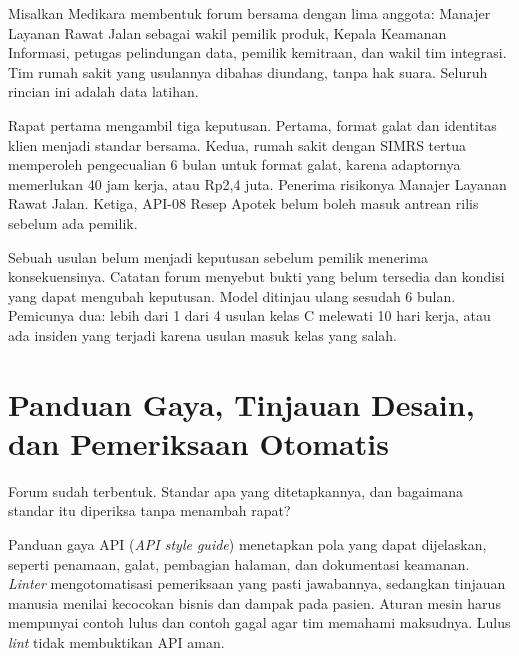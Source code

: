 \begin{kasus}[title={Kasus Medikara Health: Forum Bersama Lima Rumah Sakit}]
Misalkan Medikara membentuk forum bersama dengan lima anggota: Manajer Layanan Rawat Jalan sebagai wakil pemilik produk, Kepala Keamanan
Informasi, petugas pelindungan data, pemilik kemitraan, dan wakil tim integrasi. Tim rumah sakit yang usulannya dibahas diundang, tanpa hak
suara. Seluruh rincian ini adalah data latihan.

Rapat pertama mengambil tiga keputusan. Pertama, format galat dan identitas klien menjadi standar bersama. Kedua, rumah sakit dengan SIMRS tertua
memperoleh pengecualian 6 bulan untuk format galat, karena adaptornya memerlukan 40 jam kerja, atau Rp2,4 juta. Penerima risikonya Manajer Layanan
Rawat Jalan. Ketiga, API-08 Resep Apotek belum boleh masuk antrean rilis sebelum ada pemilik.

Sebuah usulan belum menjadi keputusan sebelum pemilik menerima konsekuensinya. Catatan forum menyebut bukti yang belum tersedia dan kondisi yang
dapat mengubah keputusan. Model ditinjau ulang sesudah 6 bulan. Pemicunya dua: lebih dari 1 dari 4 usulan kelas C melewati 10 hari kerja, atau
ada insiden yang terjadi karena usulan masuk kelas yang salah.
\end{kasus}

\section{Panduan Gaya, Tinjauan Desain, dan Pemeriksaan Otomatis}

Forum sudah terbentuk. Standar apa yang ditetapkannya, dan bagaimana standar itu diperiksa tanpa menambah rapat?

Panduan gaya API (\textit{API style guide}) menetapkan pola yang dapat dijelaskan, seperti penamaan, galat, pembagian halaman, dan dokumentasi
keamanan. \textit{Linter} mengotomatisasi pemeriksaan yang pasti jawabannya, sedangkan tinjauan manusia menilai kecocokan bisnis dan dampak pada
pasien. Aturan mesin harus mempunyai contoh lulus dan contoh gagal agar tim memahami maksudnya. Lulus \textit{lint} tidak membuktikan API aman.

